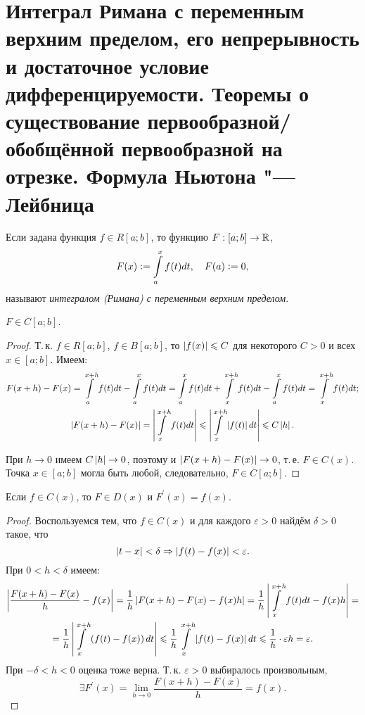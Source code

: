 \section{Интеграл Римана с переменным верхним пределом, его непрерывность и достаточное условие дифференцируемости. Теоремы о существование первообразной/обобщённой первообразной на отрезке. Формула Ньютона "---Лейбница}

\begin{definition}
    Если задана функция $f \in R[a; b]$, то функцию $F: [a; b] \to \mathbb{R}$,
    \[
        F(x) \vcentcolon = \int\limits_a^xf(t)dt,\quad F(a) \vcentcolon = 0,
    \]
    называют \textit{интегралом (Римана) с переменным верхним пределом}.
\end{definition}

\begin{theorem}
    $F \in C[a; b]$.
\end{theorem}

\begin{proof}
    Т.\,к. $f \in R[a; b]$, $f \in B[a; b]$, то $\left\lvert f(x)\right\rvert \leqslant C$ для некоторого $C > 0$ и всех $x \in [a; b]$. Имеем:
    \begin{gather*}
        F(x + h) - F(x) = \int\limits_a^{x + h}f(t)dt - \int\limits_a^xf(t)dt = \int\limits_a^xf(t)dt + \int\limits_x^{x + h}f(t)dt - \int\limits_a^xf(t)dt = \int\limits_x^{x + h}f(t)dt;\\
        \left\lvert F(x + h) - F(x)\right\rvert = \left\lvert\int\limits_x^{x + h}f(t)dt\right\rvert \leqslant \left\lvert\int\limits_x^{x + h}\left\lvert f(t)\right\rvert dt\right\rvert \leqslant C\left\lvert h\right\rvert.
    \end{gather*}

    При $h \to 0$ имеем $C\left\lvert h\right\rvert \to 0$, поэтому и $\left\lvert F(x + h) - F(x)\right\rvert \to 0$, т.\,е. $F \in C(x)$. Точка $x \in [a; b]$ могла быть любой, следовательно, $F \in C[a; b]$.
\end{proof}

\begin{theorem}
    Если $f \in C(x)$, то $F \in D(x)$ и $F^\prime(x) = f(x)$.
\end{theorem}

\begin{proof}
    Воспользуемся тем, что $f \in C(x)$ и для каждого $\varepsilon > 0$ найдём $\delta > 0$ такое, что
    \[
        \left\lvert t - x\right\rvert < \delta \Rightarrow \left\lvert f(t) - f(x)\right\rvert < \varepsilon.
    \]
    При $0 < h < \delta$ имеем:
    \begin{multline*}
        \left\lvert\frac{F(x + h) - F(x)}{h} - f(x)\right\rvert = \frac{1}{h}\left\lvert F(x + h) - F(x) - f(x)h\right\rvert = \frac{1}{h}\left\lvert\int\limits_x^{x + h}f(t)dt - f(x)h\right\rvert =\\ = \frac{1}{h}\left\lvert\int\limits_x^{x + h}\left(f(t) - f(x)\right)dt\right\rvert \leqslant \frac{1}{h}\int\limits_x^{x + h}\left\lvert f(t) - f(x)\right\rvert dt \leqslant \frac{1}{h} \cdot \varepsilon h = \varepsilon.
    \end{multline*}
    При $-\delta < h < 0$ оценка тоже верна. Т.\,к. $\varepsilon > 0$ выбиралось произвольным,
    \[
        \exists F^\prime(x) = \lim\limits_{h \to 0}\frac{F(x + h) - F(x)}{h} = f(x).
    \]
\end{proof}

